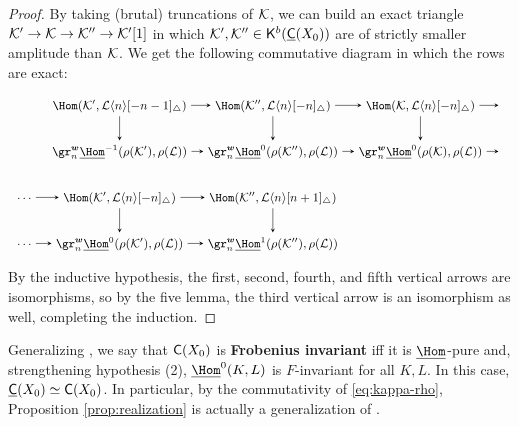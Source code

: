 \documentclass[a4paper,10pt,leqno]{amsart}
\theoremstyle{plain}
\theoremstyle{plain}
\theoremstyle{plain}
\theoremstyle{definition}
\theoremstyle{remark}
\newcommand{\dfemph}[1]{\textbf{#1}}
\begin{document}
\begin{proof}
By taking (brutal) truncations of $\cal{K}$, we can build an exact triangle $\cal{K}' \to \cal{K} \to \cal{K}'' \to \cal{K}'[1]$ in which $\cal{K}', \cal{K}'' \in \sf{K}^b(\underline{\sf{C}}(X_0))$ are of strictly smaller amplitude than $\cal{K}$.
We get the following commutative diagram in which the rows are exact:
\begin{equation}
{\small
\begin{tikzpicture}[baseline=(current bounding box.center), >=stealth]
\matrix(m)[matrix of math nodes, row sep=2em, column sep=1em, text height=2ex, text depth=0.5ex]
{	{}
		&\Hom(\cal{K}', \cal{L}\langle n\rangle[-n - 1]_\triangle)
		&\Hom(\cal{K}'', \cal{L}\langle n\rangle[-n]_\triangle)
		&\Hom(\cal{K}, \cal{L}\langle n\rangle[-n]_\triangle)
		&{}\\
	{}
		&\gr_n^{\bm{w}} \SHom^{-1}(\rho(\cal{K}'), \rho(\cal{L}))
		&\gr_n^{\bm{w}} \SHom^0(\rho(\cal{K}''), \rho(\cal{L}))
		&\gr_n^{\bm{w}} \SHom^0(\rho(\cal{K}), \rho(\cal{L}))
		&{}\\
	{\cdots}
		&\Hom(\cal{K}', \cal{L}\langle n\rangle[-n]_\triangle)
		&\Hom(\cal{K}'', \cal{L}\langle n\rangle[n + 1]_\triangle)\\
	{\cdots}
		&\gr_n^{\bm{w}} \SHom^0(\rho(\cal{K}'), \rho(\cal{L}))
		&\gr_n^{\bm{w}} \SHom^1(\rho(\cal{K}''), \rho(\cal{L}))\\
		};
\path[->,font=\scriptsize, auto]
(m-1-2)		edge (m-1-3)
(m-1-3)		edge (m-1-4)
(m-1-4)		edge (m-1-5)
(m-2-2)		edge (m-2-3)
(m-2-3)		edge (m-2-4)
(m-2-4)		edge (m-2-5)
(m-3-1)		edge (m-3-2)
(m-3-2)		edge (m-3-3)
(m-4-1)		edge (m-4-2)
(m-4-2)		edge (m-4-3)
(m-1-2)		edge (m-2-2)
(m-1-3)		edge (m-2-3)
(m-1-4)		edge (m-2-4)
(m-3-2)		edge (m-4-2)
(m-3-3)		edge (m-4-3);
\end{tikzpicture}}
\end{equation}
By the inductive hypothesis, the first, second, fourth, and fifth vertical arrows are isomorphisms, so by the five lemma, the third vertical arrow is an isomorphism as well, completing the induction.
\end{proof}

Generalizing \cite[Def.\ 2.3]{rider}, we say that $\sf{C}(X_0)$ is \dfemph{Frobenius invariant} iff it is $\SHom$-pure and, strengthening hypothesis (2), $\SHom^0(K, L)$ is $F$-invariant for all $K, L$.
In this case, $\underline{\sf{C}}(X_0) \simeq \sf{C}(X_0)$.
In particular, by the commutativity of \eqref{eq:kappa-rho}, Proposition \ref{prop:realization} is actually a generalization of \cite[Thm.\ 4.3]{rider}.
\end{document}
